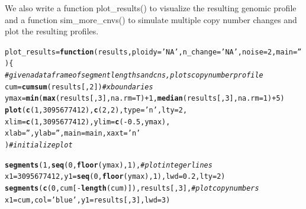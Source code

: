 \documentclass[12pt]{article}\usepackage[]{graphicx}\usepackage[]{color}
\makeatletter
\newcommand{\hlnum}[1]{\textcolor[rgb]{0.686,0.059,0.569}{#1}}%
\newcommand{\hlstr}[1]{\textcolor[rgb]{0.192,0.494,0.8}{#1}}%
\newcommand{\hlcom}[1]{\textcolor[rgb]{0.678,0.584,0.686}{\textit{#1}}}%
\newcommand{\hlopt}[1]{\textcolor[rgb]{0,0,0}{#1}}%
\newcommand{\hlstd}[1]{\textcolor[rgb]{0.345,0.345,0.345}{#1}}%
\newcommand{\hlkwa}[1]{\textcolor[rgb]{0.161,0.373,0.58}{\textbf{#1}}}%
\newcommand{\hlkwb}[1]{\textcolor[rgb]{0.69,0.353,0.396}{#1}}%
\newcommand{\hlkwc}[1]{\textcolor[rgb]{0.333,0.667,0.333}{#1}}%
\newcommand{\hlkwd}[1]{\textcolor[rgb]{0.737,0.353,0.396}{\textbf{#1}}}%
\newenvironment{kframe}{%
 \def\at@end@of@kframe{}%
 \ifinner\ifhmode%
  \def\at@end@of@kframe{\end{minipage}}%
  \begin{minipage}{\columnwidth}%
 \fi\fi%
 \def\FrameCommand##1{\hskip\@totalleftmargin \hskip-\fboxsep
 \colorbox{shadecolor}{##1}\hskip-\fboxsep
     \hskip-\linewidth \hskip-\@totalleftmargin \hskip\columnwidth}%
 \MakeFramed {\advance\hsize-\width
   \@totalleftmargin\z@ \linewidth\hsize
   \@setminipage}}%
 {\par\unskip\endMakeFramed%
 \at@end@of@kframe}
\newenvironment{knitrout}{}{} %
\makeatother
\begin{document}
We also write a function plot\_results() to visualize the resulting genomic profile and a function sim\_more\_cnvs() to simulate multiple copy number changes and plot the resulting profiles. 

\begin{knitrout}
\color{fgcolor}\begin{kframe}
\begin{alltt}
\hlstd{plot_results} \hlkwb{=} \hlkwa{function}\hlstd{(}\hlkwc{results}\hlstd{,} \hlkwc{ploidy}\hlstd{=}\hlstr{'NA'}\hlstd{,} \hlkwc{n_change}\hlstd{=}\hlstr{'NA'}\hlstd{,} \hlkwc{noise}\hlstd{=}\hlnum{2}\hlstd{,} \hlkwc{main}\hlstd{=}\hlstr{''}\hlstd{)\{}
  \hlcom{#given a dataframe of segment lengths and cns, plots copy number profile}
  \hlstd{cum} \hlkwb{=} \hlkwd{cumsum}\hlstd{(results[,}\hlnum{2}\hlstd{])} \hlcom{#x boundaries}
  \hlstd{ymax} \hlkwb{=} \hlkwd{min}\hlstd{(} \hlkwd{max}\hlstd{(results[,}\hlnum{3}\hlstd{],} \hlkwc{na.rm}\hlstd{=T)}\hlopt{+}\hlnum{1}\hlstd{,} \hlkwd{median}\hlstd{(results[,}\hlnum{3}\hlstd{],} \hlkwc{na.rm}\hlstd{=}\hlnum{1}\hlstd{)}\hlopt{+}\hlnum{5}\hlstd{)}
  \hlkwd{plot}\hlstd{(}\hlkwd{c}\hlstd{(}\hlnum{1}\hlstd{,} \hlnum{3095677412}\hlstd{),} \hlkwd{c}\hlstd{(}\hlnum{2}\hlstd{,}\hlnum{2}\hlstd{),} \hlkwc{type}\hlstd{=}\hlstr{'n'}\hlstd{,} \hlkwc{lty}\hlstd{=}\hlnum{2}\hlstd{,}
       \hlkwc{xlim} \hlstd{=} \hlkwd{c}\hlstd{(}\hlnum{1}\hlstd{,} \hlnum{3095677412}\hlstd{),} \hlkwc{ylim} \hlstd{=} \hlkwd{c}\hlstd{(}\hlopt{-}\hlnum{0.5}\hlstd{, ymax),}
       \hlkwc{xlab} \hlstd{=} \hlstr{''}\hlstd{,} \hlkwc{ylab} \hlstd{=} \hlstr{''}\hlstd{,} \hlkwc{main} \hlstd{= main,} \hlkwc{xaxt} \hlstd{=} \hlstr{'n'}
       \hlstd{)} \hlcom{#initialize plot}

  \hlkwd{segments}\hlstd{(} \hlnum{1}\hlstd{,} \hlkwd{seq}\hlstd{(}\hlnum{0}\hlstd{,} \hlkwd{floor}\hlstd{(ymax),} \hlnum{1}\hlstd{),} \hlcom{#plot integer lines}
            \hlkwc{x1} \hlstd{=} \hlnum{3095677412}\hlstd{,} \hlkwc{y1} \hlstd{=} \hlkwd{seq}\hlstd{(}\hlnum{0}\hlstd{,} \hlkwd{floor}\hlstd{(ymax),} \hlnum{1}\hlstd{),} \hlkwc{lwd}\hlstd{=}\hlnum{0.2}\hlstd{,} \hlkwc{lty}\hlstd{=}\hlnum{2}  \hlstd{)}
  \hlkwd{segments}\hlstd{(} \hlkwd{c}\hlstd{(}\hlnum{0}\hlstd{, cum[}\hlopt{-}\hlkwd{length}\hlstd{(cum)]), results[,} \hlnum{3}\hlstd{],} \hlcom{#plot copy numbers}
            \hlkwc{x1} \hlstd{= cum,} \hlkwc{col}\hlstd{=}\hlstr{'blue'}\hlstd{,} \hlkwc{y1} \hlstd{= results[,} \hlnum{3}\hlstd{],} \hlkwc{lwd}\hlstd{=}\hlnum{3}  \hlstd{)}


\end{alltt}
\end{kframe}
\end{knitrout}
\end{document}

